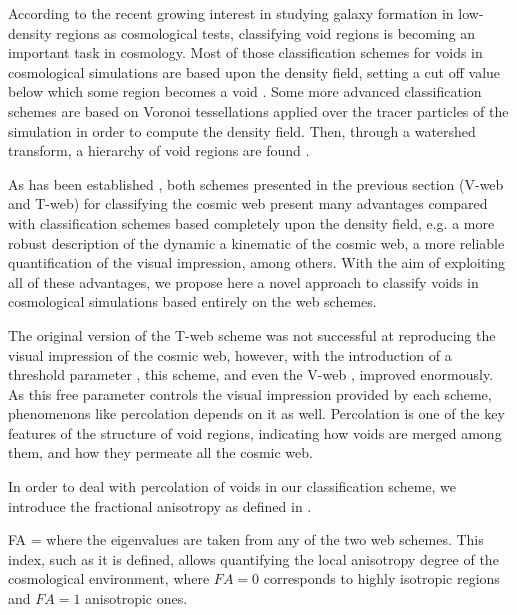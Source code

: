 \documentclass[a4,useAMS,usenatbib,usegraphicx]{latex/mn2e}
\begin{document}
According to the recent growing interest in studying galaxy formation in 
low-density regions as cosmological tests, classifying void regions is 
becoming an important task in cosmology. Most of those classification 
schemes for voids in cosmological simulations are based upon the density 
field, setting a cut off value below which some region becomes a void 
\SRKED{[references]}. Some more advanced classification schemes are based 
on Voronoi tessellations applied over the tracer particles of the 
simulation in order to compute the density field. Then, through a watershed 
transform, a hierarchy of void regions are found .


As has been established \SRKED{[references]}, both schemes presented in
the previous section (V-web and T-web) for classifying the cosmic web 
present many advantages compared with classification schemes based
completely upon the density field, e.g. a more robust description of the
dynamic a kinematic of the cosmic web, a more reliable quantification of 
the visual impression, among others. With the aim of exploiting all of 
these advantages, we propose here a novel approach to classify voids in
cosmological simulations based entirely on the web schemes.


The original version of the T-web scheme  was not
successful at reproducing the visual impression of the cosmic web, 
however, with the introduction of a threshold parameter , this scheme, and even the V-web , improved enormously. As this free parameter controls the visual 
impression provided by each scheme, phenomenons like percolation depends 
on it as well. Percolation is one of the key features of the structure of 
void regions, indicating how voids are merged among them, and how they 
permeate all the cosmic web.


In order to deal with percolation of voids in our classification scheme,
we introduce the fractional anisotropy as defined in .


{ FA =  }
where the eigenvalues are taken from any of the two web schemes. This 
index, such as it is defined, allows quantifying the local anisotropy 
degree of the cosmological environment, where $FA=0$ corresponds to highly
isotropic regions and $FA=1$ anisotropic ones.
\end{document}
